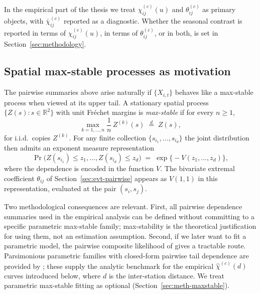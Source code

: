 In the empirical part of the thesis we treat \(\chi_{ij}^{(c)}(u)\)
and \(\theta_{ij}^{(c)}\) as primary objects, with
\(\bar\chi_{ij}^{(c)}\) reported as a diagnostic. Whether the
seasonal contrast is reported in terms of \(\chi_{ij}^{(c)}(u)\),
in terms of \(\theta_{ij}^{(c)}\), or in both, is set in
Section~\ref{sec:methodology}.

\subsection{Spatial max-stable processes as
motivation}\label{sec:evt-maxstable}

The pairwise summaries above arise naturally if \(\{X_{i,t}\}\)
behaves like a max-stable process when viewed at its upper tail. A
stationary spatial process \(\{Z(s):s\in\mathbb{R}^2\}\) with unit
Fr\'echet margins is \emph{max-stable} if for every \(n\ge 1\),
\[
    \max_{k=1,\dots,n} \frac{1}{n}\, Z^{(k)}(s)
    \;\stackrel{d}{=}\;
    Z(s),
\]
for i.i.d.\ copies \(Z^{(k)}\). For any finite collection
\(\{s_{i_1},\dots,s_{i_d}\}\) the joint distribution then admits an
exponent measure representation
\[
    \Pr\!\bigl( Z(s_{i_1}) \le z_1,\dots,Z(s_{i_d}) \le z_d \bigr)
    \;=\;
    \exp\!\bigl\{-V(z_1,\dots,z_d)\bigr\},
\]
where the dependence is encoded in the function \(V\). The bivariate
extremal coefficient \(\theta_{ij}\) of
Section~\ref{sec:evt-pairwise} appears as \(V(1,1)\) in this
representation, evaluated at the pair \((s_i,s_j)\).

Two methodological consequences are relevant. First, all pairwise
dependence summaries used in the empirical analysis can be defined
without committing to a specific parametric max-stable family;
max-stability is the theoretical justification for using them, not
an estimation assumption. Second, if we later want to fit a
parametric model, the pairwise composite likelihood of
\citet{TODO-padoan2010} gives a tractable route. Parsimonious
parametric families with closed-form pairwise tail dependence are
provided by \citet{TODO-dehaan2006}; these supply the analytic
benchmark for the empirical \(\widehat\chi^{(c)}(d)\) curves
introduced below, where \(d\) is the inter-station distance. We
treat parametric max-stable fitting as optional
(Section~\ref{sec:meth-maxstable}).

